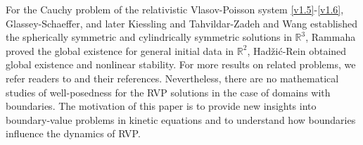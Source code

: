 \documentclass[11pt,reqno]{amsart}%
\theoremstyle{definition}
\theoremstyle{remark}
\begin{document}
For the Cauchy problem of the relativistic Vlasov-Poisson system  \eqref{v1.5}-\eqref{v1.6},  Glassey-Schaeffer\cite{GS,GS1}, and later Kiessling and Tahvildar-Zadeh \cite{KT2008} and Wang \cite{WangXC2023} established the spherically symmetric and  cylindrically symmetric solutions  in $\mathbb{R}^{3}$,
Rammaha\cite{R} proved the global existence for general initial data in $\mathbb{R}^{2}$, Had\v{z}i\'{c}-Rein \cite{H} obtained global existence and nonlinear stability.
For more results on related problems, we refer readers to \cite{GS2,GS3,GS4,GS5,GS6,GS7,GS8,K,WangXC2023} and their references. 
%
Nevertheless, there are no mathematical studies of well-posedness for the RVP solutions in the case of domains with boundaries. 
The motivation of this paper is to provide new insights into boundary-value problems in kinetic equations and to understand how boundaries influence the dynamics of RVP.

\end{document}
